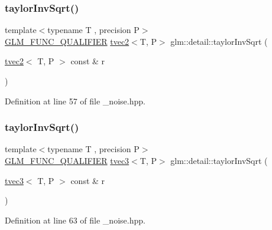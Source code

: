 \subsubsection{\texorpdfstring{taylorInvSqrt()}{taylorInvSqrt()}\hspace{0.1cm}{\footnotesize\ttfamily [2/4]}}
{\footnotesize\ttfamily template$<$typename T , precision P$>$ \\
\mbox{\hyperlink{setup_8hpp_a33fdea6f91c5f834105f7415e2a64407}{G\+L\+M\+\_\+\+F\+U\+N\+C\+\_\+\+Q\+U\+A\+L\+I\+F\+I\+ER}} \mbox{\hyperlink{structglm_1_1tvec2}{tvec2}}$<$T, P$>$ glm\+::detail\+::taylor\+Inv\+Sqrt (\begin{DoxyParamCaption}\item[{\mbox{\hyperlink{structglm_1_1tvec2}{tvec2}}$<$ T, P $>$ const \&}]{r }\end{DoxyParamCaption})}



Definition at line 57 of file \+\_\+noise.\+hpp.

\mbox{\label{namespaceglm_1_1detail_a1caf0cdde7601f279fcc51436474b9f6}} 
\subsubsection{\texorpdfstring{taylorInvSqrt()}{taylorInvSqrt()}\hspace{0.1cm}{\footnotesize\ttfamily [3/4]}}
{\footnotesize\ttfamily template$<$typename T , precision P$>$ \\
\mbox{\hyperlink{setup_8hpp_a33fdea6f91c5f834105f7415e2a64407}{G\+L\+M\+\_\+\+F\+U\+N\+C\+\_\+\+Q\+U\+A\+L\+I\+F\+I\+ER}} \mbox{\hyperlink{structglm_1_1tvec3}{tvec3}}$<$T, P$>$ glm\+::detail\+::taylor\+Inv\+Sqrt (\begin{DoxyParamCaption}\item[{\mbox{\hyperlink{structglm_1_1tvec3}{tvec3}}$<$ T, P $>$ const \&}]{r }\end{DoxyParamCaption})}



Definition at line 63 of file \+\_\+noise.\+hpp.

\mbox{\label{namespaceglm_1_1detail_aeed0650a4d83ef1ac366990c0350a583}} 
